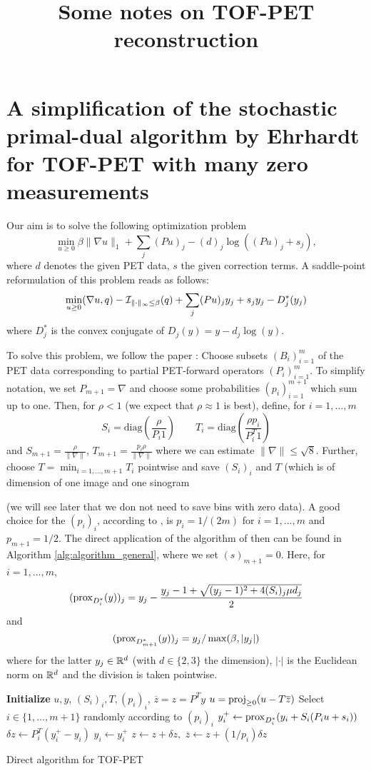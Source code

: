 \documentclass{article}
\title{Some notes on TOF-PET reconstruction}
\author{}
\date{}
\begin{document}
\section{A simplification of the stochastic primal-dual algorithm by Ehrhardt for TOF-PET with many zero measurements}
Our aim is to solve the following optimization problem
\[ \min _{u\geq 0} \beta \|\nabla u\|_1 + \sum_j (Pu)_ j -  (d)_j \log( (Pu)_ j + s_ j ) ,\]
where $d$ denotes the given PET data, $s$ the given correction terms. A saddle-point reformulation of this problem reads as follows:
\[ \min _{u\geq 0} (\nabla u,q) - \mathcal{I}_{\|\cdot \|_\infty \leq \beta} (q) + \sum_j (Pu)_jy_j + s_jy_j - D_j^*(y_j) \]
where $D_j^*$ is the convex conjugate of $D_j(y) = y - d_j \log(y)$. 

To solve this problem, we follow the paper \cite{Ehrhardt2019}: Choose subsets $(B_i)_{i=1}^m$ of the PET data corresponding to partial PET-forward operators $(P_i)_{i=1}^m$. 
To simplify notation, we set $P_{m+1} = \nabla$ and choose some probabilities $(p_i)_{i=1}^{m+1}$ which sum up to one. 
Then, for $\rho<1$ (we expect that $\rho\approx 1$ is best), define, for $i=1,\ldots,m$
\[ S_i = \text{diag}(\frac{\rho}{P_i 1} )\qquad  T_i = \text{diag}(\frac{\rho p_i}{P^T_i 1}) \]
and $S_{m+1} = \frac{\rho}{\|\nabla\|}$, $T_{m+1} = \frac{p_i\rho}{\|\nabla\|}$ where we can estimate 
$\|\nabla \| \leq \sqrt{8}$. Further, choose $T = \min_{i=1,\ldots,m+1} T_i$ pointwise and 
save $(S_i)_i$ and $T$ (which is of dimension of one image and one sinogram 

(we will see later that we don not need to save bins with zero data). A good choice for the $(p_i)_i$, according to \cite{Ehrhardt2019}, is $p_i = 1/(2m)$ for $i=1,\ldots,m$ and $p_{m+1} = 1/2$. The direct application of the algorithm of \cite{Ehrhardt2019} then can be found in Algorithm  \ref{alg:algorithm_general}, where we set $(s)_{m+1} = 0$.  Here, for $i=1,\ldots,m$, 
\[ (\operatorname{prox}_{D_i^*}(y))_j = y_j - \frac{y_j - 1 + \sqrt{ (y_j-1)^2 + 4 (S_i)_j \mu d_j}}{2}\]
and 
\[ (\operatorname{prox}_{D_{m+1}^*}(y) )_j = y_j /\max(\beta,|y_j|) \]
where for the latter $y_j \in \mathbb{R}^d$ (with $d \in \{2,3\}$ the dimension), $|\cdot |$ is the Euclidean norm on $\mathbb{R}^d$ and the division is taken pointwise.

\begin{algorithm}[t]
  \begin{algorithmic}[1]
\onehalfspacing


\State \textbf{Initialize} $u,y$, $(S_i)_i,T,(p_i)_i$, $\overline{z}= z = P^T y$
\Repeat
	\State $u = \operatorname{proj}_{\geq 0} (u - T \overline{z})$
	\State Select $i \in \{ 1,\ldots,m+1\} $ randomly according to $(p_i)_i$
	\State \quad $y_i^+ \gets \operatorname{prox}_{D_i^*} ( y_i + S_i  ( P_i u + s_i))$
	\State \quad $\delta z \gets P_i^T (y_i^+ - y_i)$
	\State \quad $y_i \gets y_i^+$
	\State $z \gets z + \delta z, $
	\State $\overline{z} \gets  z + (1/p_i) \delta z$
\State {}
\EndFunction
\end{algorithmic}
\caption{Direct algorithm for TOF-PET}\label{alg:algorithm_general}
\end{algorithm}
\end{document}

